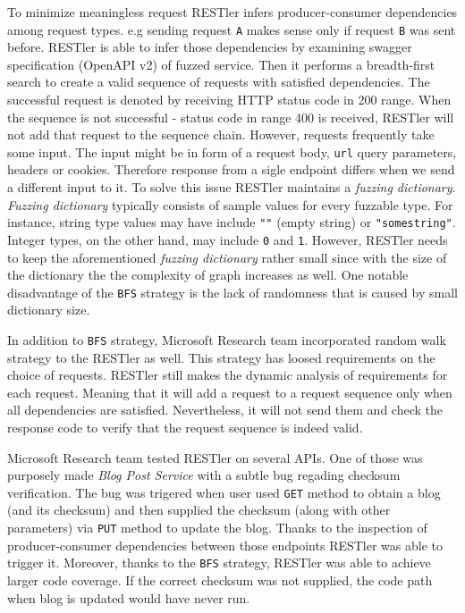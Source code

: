 To minimize meaningless request RESTler infers producer-consumer dependencies among request types. e.g sending request \texttt{A} makes sense only if request \texttt{B} was sent before. RESTler is able to infer those dependencies by examining swagger specification (OpenAPI v2) of fuzzed service. Then it performs a breadth-first search to create a valid sequence of requests with satisfied dependencies. The successful request is denoted by receiving HTTP status code in 200 range. When the sequence is not successful - status code in range 400 is received, RESTler will not add that request to the sequence chain. However, requests frequently take some input. The input might be in form of a request body, \texttt{url} query parameters, headers or cookies. Therefore response from a sigle endpoint differs when we send a different input to it. To solve this issue RESTler maintains a \textit{fuzzing dictionary}. \textit{Fuzzing dictionary} typically consists of sample values for every fuzzable type. For instance, string type values may have include \texttt{""} (empty string) or \texttt{"somestring"}. Integer types, on the other hand, may include \texttt{0} and \texttt{1}. However, RESTler needs to keep the aforementioned \textit{fuzzing dictionary} rather small since with the size of the dictionary the the complexity of graph increases as well. One notable disadvantage of the \texttt{BFS} strategy is the lack of randomness that is caused by small dictionary size.

In addition to \texttt{BFS} strategy, Microsoft Research team incorporated random walk strategy to the RESTler as well. This strategy has loosed requirements on the choice of requests. RESTler still makes the dynamic analysis of requirements for each request. Meaning that it will add a request to a request sequence only when all dependencies are satisfied. Nevertheless, it will not send them and check the response code to verify that the request sequence is indeed valid.

Microsoft Research team tested RESTler on several APIs. One of those was purposely made \textit{Blog Post Service} with a subtle bug regading checksum verification. The bug was trigered when user used \texttt{GET} method to obtain a blog (and its checksum) and then supplied the checksum (along with other parameters) via \texttt{PUT} method to update the blog. Thanks to the inspection of producer-consumer dependencies between those endpoints RESTler was able to trigger it. Moreover, thanks to the \texttt{BFS} strategy, RESTler was able to achieve larger code coverage. If the correct checksum was not supplied, the code path when blog is updated would have never run.

